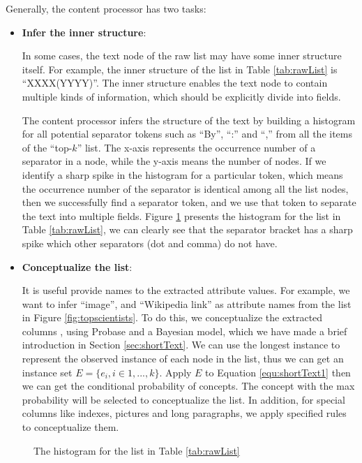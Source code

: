 Generally, the content processor has two tasks:

\begin{itemize}
  \item \textbf{Infer the inner structure}:

  In some cases, the text node of the raw list may have some inner structure itself. For example, the inner structure of the list in Table \ref{tab:rawList} is ``XXXX(YYYY)''. The inner structure enables the text node to contain multiple kinds of information, which should be explicitly divide into fields.

  The content processor infers the structure of
the text \cite{Fisher08:dirttoshovels} by building a histogram for
all potential separator tokens such as ``By'', ``:'' and ``,'' from all the items
of the ``top-$k$'' list.
The x-axis represents the occurrence number of a separator in a node,
while the y-axis means the number of nodes.
If we identify a sharp spike in the histogram for a
particular token, which means the occurrence number of the separator is identical among all the list nodes, then we successfully find a separator token, and we use that
token to separate the text into multiple fields.
Figure \ref{fig:histogram} presents the histogram for the list in Table \ref{tab:rawList}, we can clearly see that the separator bracket has a sharp spike which other separators (dot and comma) do not have.

  \item \textbf{Conceptualize the list}:

  It is useful provide names to the extracted attribute values. For example,
we want to infer ``image'', and ``Wikipedia link'' as
attribute names from the list in Figure \ref{fig:topscientists}.
To do this, we conceptualize the extracted columns \cite{Song11:Conceptualize},
using Probase and a Bayesian model,
which we have made a brief introduction in Section \ref{sec:shortText}.
We can use the longest instance to represent the observed instance of each node in the list, thus we can get an instance set $E=\{e_{i},i \in 1,...,k\}$. Apply $E$ to Equation \ref{equ:shortText1} then we can get the conditional probability of concepts.
The concept with the max probability will be selected to conceptualize the list.
In addition, for special columns like indexes, pictures and long paragraphs,
we apply specified rules to conceptualize them.

\end{itemize}

\begin{figure}[th]
\centering
{}
\caption{The histogram for the list in Table \ref{tab:rawList}}
\label{fig:histogram}
\end{figure}


